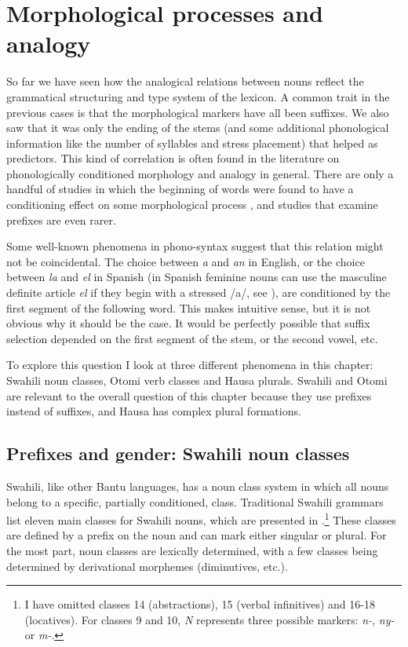 \chapter{Morphological processes and analogy}\label{chap:structural}

So far we have seen how the analogical relations between nouns reflect the grammatical structuring and type system of the lexicon. A common trait in the previous cases is that the morphological markers have all been suffixes. We also saw that it was only the ending of the stems (and some additional phonological information like the number of syllables and stress placement) that helped as predictors. This kind of correlation is often found in the literature on phonologically conditioned morphology and analogy in general. There are only a handful of studies in which the beginning of words were found to have a conditioning effect on some morphological process \autocite{Bybee.1982, Kopcke.1984}, and studies that examine prefixes are even rarer.

Some well-known phenomena in phono-syntax suggest that this relation might not be coincidental. The choice between \textit{a} and \textit{an} in English, or the choice between \textit{la} and \textit{el} in Spanish (in Spanish feminine nouns can use the masculine definite article \textit{el} if they begin with a stressed /a/, see \citealt{Harris.1987}), are conditioned by the first segment of the following word. This makes intuitive sense, but it is not obvious why it should be the case. It would be perfectly possible that suffix selection depended on the first segment of the stem, or the second vowel, etc.

To explore this question I look at three different phenomena in this chapter: Swahili noun classes, Otomi verb classes and Hausa plurals. Swahili and Otomi are relevant to the overall question of this chapter because they use prefixes instead of suffixes, and Hausa has complex plural formations. %

\section{Prefixes and gender: Swahili noun classes}


Swahili, like other Bantu languages, has a noun class 
system in which all nouns belong to a specific, partially conditioned, class. Traditional Swahili grammars list eleven main classes for Swahili nouns, which are presented in .\footnote{I have omitted classes 14 (abstractions), 15 (verbal infinitives) and 16-18 (locatives). For classes 9 and 10, \textit{N} represents three possible markers: \textit{n-}, \textit{ny-} or \textit{m-}.} These classes are defined by a prefix on the noun and can mark either singular or plural. For the most part, noun classes are lexically determined, with a few classes being determined by derivational morphemes (diminutives, etc.). %

